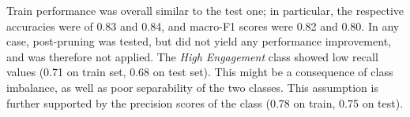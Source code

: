 Train performance was overall similar to the test one; in particular, the respective accuracies
were of 0.83 and 0.84, and macro-F1 scores were 0.82 and 0.80.
In any case, post-pruning was tested, but did not yield any performance improvement, and was therefore
not applied.
The \textit{High Engagement} class showed low recall values (0.71 on train set, 0.68 on test set).
This might be a consequence of class imbalance, as well as poor separability of the two classes.
This assumption is further supported by the
precision scores of the class (0.78 on train, 0.75 on test).



